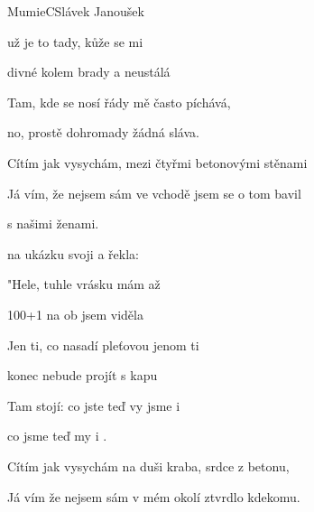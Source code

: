 \setcounter{page}{55}
\begin{song}{Mumie}{C}{Slávek Janoušek}

\begin{SBVerse}

 už je to tady, kůže se mi 

divné  kolem brady a neustálá 

Tam, kde se nosí řády mě často píchává,

no, prostě dohromady žádná sláva.

\end{SBVerse}

\begin{SBVerse}

Cítím jak vysychám, mezi čtyřmi betonovými stěnami

Já vím, že nejsem sám ve vchodě jsem se o tom bavil

s našimi ženami.

\end{SBVerse}

\begin{SBChorus*}

 na ukázku  svoji   a řekla:

"Hele,  tuhle vrásku  mám až  

 100+1 na ob jsem viděla  

Jen ti, co  nasadí pleťovou  jenom ti  

 konec  nebude   projít  s kapu

\end{SBChorus*}
\begin{SBChorus}

Tam stojí:  co jste teď vy  jsme i 

 co jsme teď my  i . 

\end{SBChorus}

\begin{SBVerse}

Cítím jak vysychám na duši kraba, srdce z betonu,

Já vím že nejsem sám v mém okolí ztvrdlo kdekomu.


\end{SBVerse}
\end{song}
